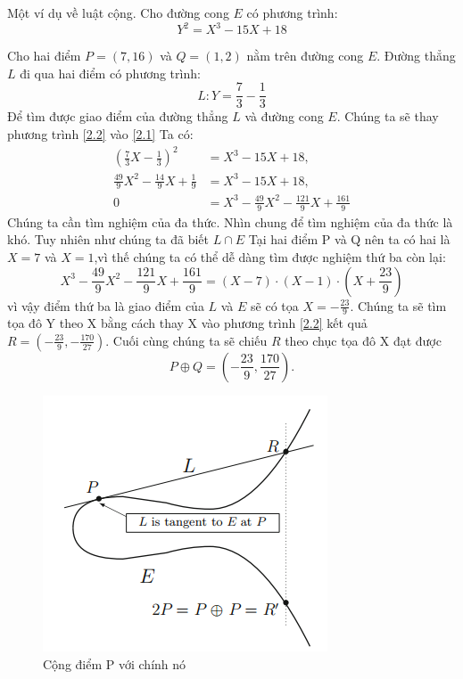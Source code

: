 \documentclass[a4paper,12pt]{report}
\begin{document}
Một ví dụ về luật cộng. Cho đường cong $E$ có phương trình:
\begin{equation}
Y^2 = X^3 - 15X + 18 \label{2.1}
\end{equation}

Cho hai điểm $P = (7,16)$ và $Q = (1,2)$ nằm trên đường cong $E$. Đường thẳng $L$ đi qua hai điểm có phương trình:
\begin{equation}
L: Y = \frac{7}{3} - \frac{1}{3} \label{2.2}
\end{equation}
Để tìm được giao điểm của đường thẳng $L$ và đường cong $E$. Chúng ta sẽ thay phương trình \ref{2.2} vào \ref{2.1} Ta có:
\begin{displaymath}
\begin{aligned}
(\frac{7}{3}X - \frac{1}{3})^2 & = X^3 - 15X + 18, \\
\frac{49}{9}X^2 - \frac{14}{9}X + \frac{1}{9} & = X^3 - 15X + 18, \\
0 & = X^3 - \frac{49}{9}X^2 - \frac{121}{9}X + \frac{161}{9}
\end{aligned}
\end{displaymath}
Chúng ta cần tìm nghiệm của đa thức. Nhìn chung để tìm nghiệm của đa thức là khó. Tuy nhiên như chúng ta đã biết $L \cap E$ Tại hai điểm P và Q nên ta có hai là $X = 7$ và $X = 1$,vì thế chúng ta có thể dễ dàng tìm được nghiệm thứ ba còn lại:
\begin{displaymath}
X^3 - \frac{49}{9}X^2 - \frac{121}{9}X + \frac{161}{9} = (X - 7)\cdot(X - 1)\cdot(X + \frac{23}{9})
\end{displaymath}
vì vậy điểm thứ ba là giao điểm của $L$ và $E$ sẽ có tọa $\displaystyle X = -\frac{23}{9}$. Chúng ta sẽ tìm tọa đô Y theo X bằng cách thay X vào phương trình \ref{2.2} kết quả $\displaystyle R = (-\frac{23}{9}, -\frac{170}{27})$. Cuối cùng chúng ta sẽ chiếu $R$ theo chục tọa đô X đạt được 
\begin{displaymath}
P \oplus Q = (-\frac{23}{9}, \frac{170}{27}).
\end{displaymath} 

\begin{figure}[h] 
\begin{center}
\includegraphics[scale=1]{../im3.png}
\caption{Cộng điểm P với chính nó} \label{h2.3}
\end{center}
\end{figure}
\end{document}
